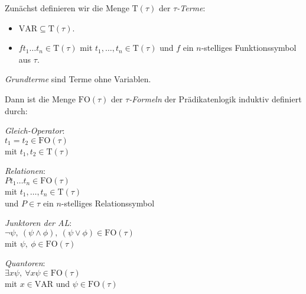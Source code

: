 \documentclass{panikzettel}
\newcommand{\FO}{\mathrm{FO}}
\newcommand{\VAR}{\mathrm{VAR}}
\newcommand{\T}{\mathrm{T}}
\begin{document}
Zunächst definieren wir die Menge $\T(\tau)$ der \emph{$\tau$-Terme}:
\begin{itemize}
    \item $\VAR \subseteq \T(\tau)$.
    \item $f t_1 \ldots t_n \in \T(\tau)$ mit $t_1, \ldots, t_n \in \T(\tau)$ und $f$ ein $n$-stelliges Funktionssymbol aus $\tau$.
\end{itemize}

\emph{Grundterme} sind Terme ohne Variablen.

Dann ist die Menge $\FO(\tau)$ der \emph{$\tau$-Formeln} der Prädikatenlogik induktiv definiert durch:

\begin{minipage}[t]{0.2\textwidth}
\begin{center}
\emph{Gleich-Operator}: \\
$t_1 = t_2 \in \FO(\tau)$ \\ \footnotesize
mit $t_1, t_2 \in \T(\tau)$
\end{center}
\end{minipage}
\begin{minipage}[t]{0.25\textwidth}
\begin{center}
\emph{Relationen}: \\
$P t_1 \ldots t_n \in \FO(\tau)$ \\ \footnotesize
mit $t_1, \ldots, t_n \in \T(\tau)$ \\
und $P \in \tau$ ein $n$-stelliges Relationssymbol
\end{center}
\end{minipage}
\begin{minipage}[t]{0.3\textwidth}
\begin{center}
\emph{Junktoren der AL}: \\
$\neg \psi,\ (\psi \land \phi),\ (\psi \lor \phi) \in \FO(\tau)$ \\ \footnotesize
mit $\psi,\ \phi \in \FO(\tau)$
\end{center}
\end{minipage}
\begin{minipage}[t]{0.25\textwidth}
\begin{center}
\emph{Quantoren}: \\
$\exists x \psi,\ \forall x \psi \in \FO(\tau)$ \\ \footnotesize
mit $x \in \VAR$ und $\psi \in \FO(\tau)$
\end{center}
\end{minipage}
\ \\
\end{document}

